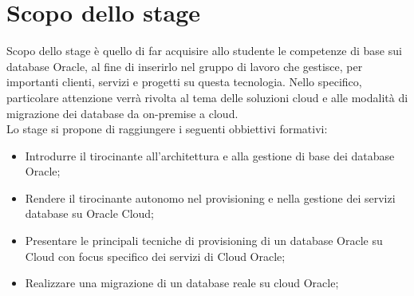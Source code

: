 \section*{Scopo dello stage}
Scopo dello stage è quello di far acquisire allo studente le competenze di base sui database Oracle, al fine di inserirlo nel gruppo di lavoro che gestisce, per importanti clienti, servizi e progetti su questa tecnologia. 
Nello specifico, particolare attenzione verrà rivolta al tema delle soluzioni cloud e alle modalità di migrazione dei database da on-premise a cloud. \\

Lo stage si propone di raggiungere i seguenti obbiettivi formativi:

\begin{itemize}
    \item Introdurre il tirocinante all'architettura e alla gestione di base dei database Oracle;
    \item Rendere il tirocinante autonomo nel provisioning e nella gestione dei servizi database su Oracle Cloud;
    \item Presentare le principali tecniche di provisioning di un database Oracle su Cloud con focus specifico dei servizi di Cloud Oracle;
    \item Realizzare una migrazione di un database reale su cloud Oracle;
\end{itemize}